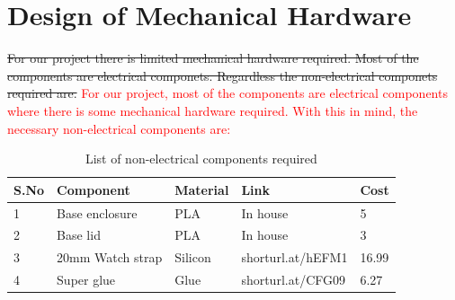 \documentclass[12pt, titlepage]{article}
\begin{document}
\section{Design of Mechanical Hardware}
\sout{For our project there is limited mechanical hardware required. Most of the components are electrical componets. Regardless the non-electrical componets required are.}
\textcolor{red}{For our project, most of the components are electrical components where there is some mechanical hardware required. With this in mind, the necessary non-electrical components are:}
\begin{table}[H]
\centering
\caption{List of non-electrical components required}
\begin{tabular}{lllll}
S.No & Component        & Material & Link              & Cost  \\ \hline
1    & Base enclosure   & PLA      & In house          & 5     \\
2    & Base lid         & PLA      & In house          & 3     \\
3    & 20mm Watch strap & Silicon  & shorturl.at/hEFM1 & 16.99 \\
4    & Super glue       & Glue     & shorturl.at/CFG09 & 6.27 
\end{tabular}
\label{tab:my-table}
\end{table}
\end{document}
